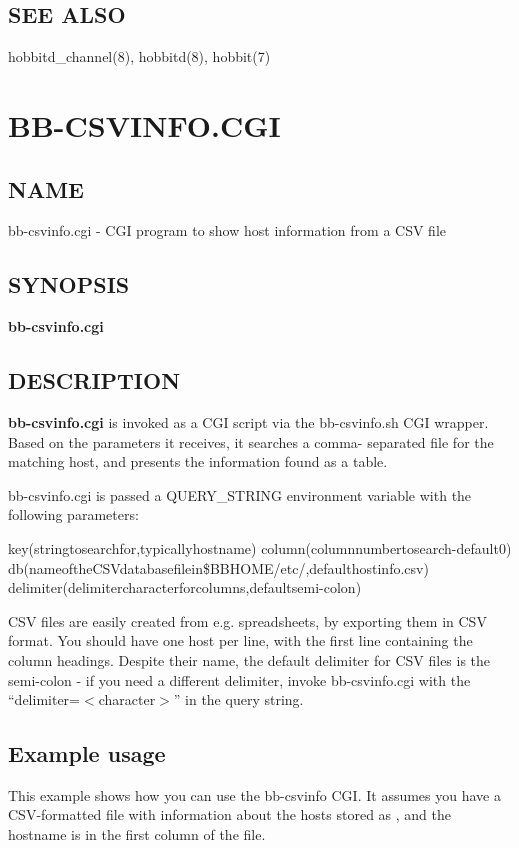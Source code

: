 \subsection{SEE ALSO}
hobbitd\_channel(8), hobbitd(8), hobbit(7) 


%
\newpage
\section{BB-CSVINFO.CGI}
\subsection{NAME}
 bb-csvinfo.cgi - CGI program to show host information from a CSV file \subsection{SYNOPSIS}
\textbf{bb-csvinfo.cgi}


 
\subsection{DESCRIPTION}
\textbf{bb-csvinfo.cgi}
 is invoked as a CGI script via the bb-csvinfo.sh CGI wrapper. Based
 on the parameters it receives, it searches a comma- separated file
 for the matching host, and presents the information found as a
 table. 


  bb-csvinfo.cgi is passed a QUERY\_STRING environment variable with
  the following parameters: 



  
key(stringtosearchfor,typicallyhostname)  
column(columnnumbertosearch-default0)  
db(nameoftheCSVdatabasefilein\$BBHOME/etc/,defaulthostinfo.csv) 
delimiter(delimitercharacterforcolumns,defaultsemi-colon) 


  CSV files are easily created from e.g. spreadsheets, by exporting
  them in CSV format. You should have one host per line, with the
  first line containing the column headings. Despite their name, the
  default delimiter for CSV files is the semi-colon - if you need a
  different delimiter, invoke bb-csvinfo.cgi with the
  ``delimiter=$<$character$>$'' in the query string. 



 
\subsection{Example usage}
 This example shows how you can use the bb-csvinfo CGI. It assumes you
 have a CSV-formatted file with information about the hosts stored as
 , and the hostname is in the first column of
 the file. 


